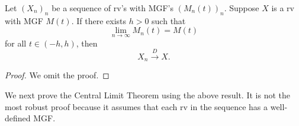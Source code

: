 \documentclass[11pt,fleqn]{book} %
\begin{document}
\begin{theorem} \label{thm:441}
Let \((X_n)_n\) be a sequence of rv's with MGF's \((M_n(t))_n\). Suppose \(X\) is a rv with MGF \(M(t)\). If there exists \(h > 0\) such that
\[
\lim_{n\rightarrow\infty}M_n(t) = M(t)
\]
for all \(t \in (-h, h)\), then
\[
X_n\xrightarrow{D}X.
\]
\end{theorem}
\begin{proof}
We omit the proof.
\end{proof}

\begin{remark} \label{rmk:442}
We next prove the Central Limit Theorem using the above result. It is not the most robust proof because it assumes that each rv in the sequence has a well-defined MGF.
\end{remark}
\end{document}
